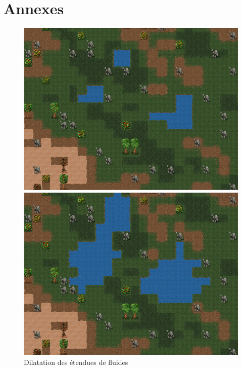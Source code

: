 \documentclass[a4paper]{article}
\begin{document}
  \newpage
  \part{Annexes}
	\begin{figure}
	  \begin{center}
		\includegraphics[scale=0.45]{img/DilateFluid.png}
	  \end{center}
	  \caption{Dilatation des étendues de fluides}
	\end{figure}
\end{document}
